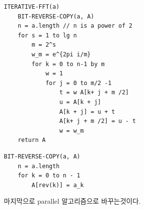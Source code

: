 \begin{lstlisting}[style = CStyle]
ITERATIVE-FFT(a)
    BIT-REVERSE-COPY(a, A)
    n = a.length // n is a power of 2
    for s = 1 to lg n
        m = 2^s
        w_m = e^{2pi i/m}
        for k = 0 to n-1 by m
            w = 1
            for j = 0 to m/2 -1
                t = w A[k+ j + m /2]
                u = A[k + j]
                A[k + j] = u + t
                A[k+ j + m /2] = u - t
                w = w_m
    return A
\end{lstlisting}

\begin{lstlisting}[style = CStyle]
BIT-REVERSE-COPY(a, A)
    n = a.length
    for k = 0 to n - 1
        A[rev(k)] = a_k
\end{lstlisting}


마지막으로 parallel 알고리즘으로 바꾸는것이다.
